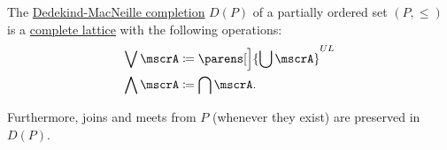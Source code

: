 \begin{theorem}\label{thm:def:dedekind_macnielle_completion}
  The \hyperref[def:dedekind_macnielle_completion]{Dedekind-MacNeille completion} \( D(P) \) of a partially ordered set \( (P, \leq) \) is a \hyperref[def:lattice]{complete lattice} with the following operations:
  \begin{align}
    \bigvee \mscrA   &\coloneqq \parens[\Big]{ \bigcup \mscrA }^{UL} \label{eq:thm:def:dedekind_macnielle_completion/join} \\
    \bigwedge \mscrA &\coloneqq \bigcap \mscrA.                      \label{eq:thm:def:dedekind_macnielle_completion/meet}
  \end{align}

  Furthermore, joins and meets from \( P \) (whenever they exist) are preserved in \( D(P) \).
\end{theorem}
